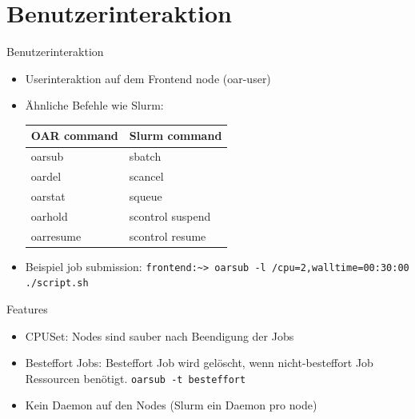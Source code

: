 \documentclass[10pt,utf8]{beamer}
\begin{document}
\section{Benutzerinteraktion}
\begin{frame}{Benutzerinteraktion}

    \begin{itemize}
        \item{Userinteraktion auf dem Frontend node (oar-user)}
    \item{Ähnliche Befehle wie Slurm:
    \begin{table}
    \begin{tabular}{l|l}
          OAR command & Slurm command \\ \hline
        oarsub & sbatch  \\
        oardel  & scancel  \\
        oarstat & squeue  \\
        oarhold & scontrol suspend  \\
          oarresume & scontrol resume \\
    \end{tabular}
\end{table}
}
    \item{Beispiel job submission: \lstinline{frontend:~> oarsub -l /cpu=2,walltime=00:30:00 ./script.sh}
}
    \end{itemize}
\end{frame}
\begin{frame}{Features}
\begin{itemize}
    \item{CPUSet: Nodes sind sauber nach Beendigung der Jobs}
    \item{Besteffort Jobs: Besteffort Job wird gelöscht, wenn nicht-besteffort Job Ressourcen benötigt. \lstinline{oarsub -t besteffort}}
    \item{Kein Daemon auf den Nodes (Slurm ein Daemon pro node)}
\end{itemize}
\end{frame}
\end{document}
